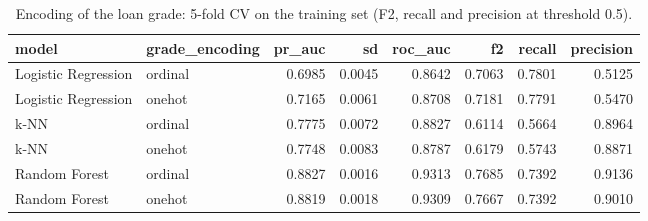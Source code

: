 \begin{table}[H]
\centering
\scriptsize
\begin{adjustbox}{max width=\linewidth}
\begin{tabular}{llrrrrrr}
\toprule
model & grade\_encoding & pr\_auc & sd & roc\_auc & f2 & recall & precision \\
\midrule
Logistic Regression & ordinal & 0.6985 & 0.0045 & 0.8642 & 0.7063 & 0.7801 & 0.5125 \\
Logistic Regression & onehot & 0.7165 & 0.0061 & 0.8708 & 0.7181 & 0.7791 & 0.5470 \\
k-NN & ordinal & 0.7775 & 0.0072 & 0.8827 & 0.6114 & 0.5664 & 0.8964 \\
k-NN & onehot & 0.7748 & 0.0083 & 0.8787 & 0.6179 & 0.5743 & 0.8871 \\
Random Forest & ordinal & 0.8827 & 0.0016 & 0.9313 & 0.7685 & 0.7392 & 0.9136 \\
Random Forest & onehot & 0.8819 & 0.0018 & 0.9309 & 0.7667 & 0.7392 & 0.9010 \\
\bottomrule
\end{tabular}
\end{adjustbox}
\caption{Encoding of the loan grade: 5-fold CV on the training set (F2, recall and precision at threshold 0.5).}
\label{tab:suite_encoding}
\end{table}
